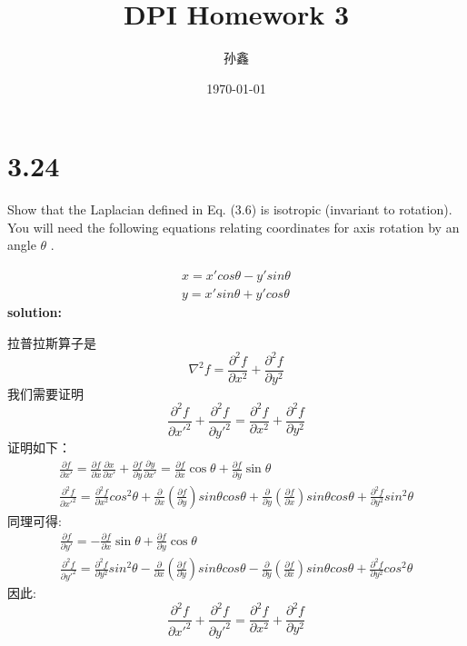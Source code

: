 \documentclass[UTF8,titlepage]{ctexart}
\title{DPI Homework 3}
\author{孙鑫}
\date{\today}
\begin{document}
\maketitle

\section*{3.24}
\noindent Show that the Laplacian defined in Eq. (3.6) is isotropic (invariant to rotation). You will need the following equations relating coordinates for axis rotation by an angle $\theta$ .

\begin{gather}
        x = x'cos\theta - y'sin\theta\\
        y=x'sin\theta + y'cos\theta
\end{gather}
\noindent \textbf{solution:}

\noindent 拉普拉斯算子是
\begin{equation}
    \nabla^2f=\frac{\partial^2f}{\partial x^2}+\frac{\partial^2f}{\partial y^2}
\end{equation}
我们需要证明
\begin{equation}
    \frac{\partial^2f}{\partial x'^2}+\frac{\partial^2f}{\partial y'^2}=\frac{\partial^2f}{\partial x^2}+\frac{\partial^2f}{\partial y^2}
\end{equation}
证明如下：
\begin{gather}
    \frac{\partial f}{\partial x'}=\frac{\partial f}{\partial x}\frac{\partial x}{\partial x'}+\frac{\partial f}{\partial y}\frac{\partial y}{\partial x'}=\frac{\partial f}{\partial x}\cos \theta+\frac{\partial f}{\partial y}\sin \theta\\
    \frac{\partial^2f}{\partial x'^2}=\frac{\partial^2f}{\partial x^2}cos^2\theta +\frac{\partial}{\partial x}(\frac{\partial f}{\partial y})sin\theta cos\theta +\frac{\partial}{\partial y}(\frac{\partial f}{\partial x})sin\theta cos\theta + \frac{\partial^2f}{\partial y^2}sin^2\theta
\end{gather}
同理可得:
\begin{gather}
    \frac{\partial f}{\partial y'}=-\frac{\partial f}{\partial x}\sin \theta+\frac{\partial f}{\partial y}\cos \theta\\
    \frac{\partial^2f}{\partial y'^2}=\frac{\partial^2f}{\partial y^2}sin^2\theta -\frac{\partial}{\partial x}(\frac{\partial f}{\partial y})sin\theta cos\theta -\frac{\partial}{\partial y}(\frac{\partial f}{\partial x})sin\theta cos\theta + \frac{\partial^2f}{\partial y^2}cos^2\theta     
\end{gather}
因此:
\begin{equation}
    \frac{\partial^2f}{\partial x'^2}+\frac{\partial^2f}{\partial y'^2}=\frac{\partial^2f}{\partial x^2}+\frac{\partial^2f}{\partial y^2}
\end{equation}
\end{document}
